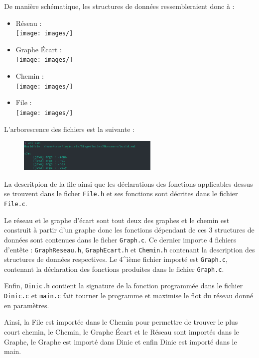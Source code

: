 \documentclass[11pt, a4paper]{report}
\begin{document}
	De manière schématique, les structures de données ressembleraient donc à :
	\begin{itemize}
        \item Réseau :\\
		\texttt{[image: images/]}\\
        \item Graphe Écart :\\
		\texttt{[image: images/]}\\
        \item Chemin :\\
		\texttt{[image: images/]}\\
        \item File :\\
		\texttt{[image: images/]}\\
	\end{itemize}
	
	L'arborescence des fichiers est la suivante :
	
	\begin{figure}[H]
		\captionsetup{justification=centering}
		\centering
		\includegraphics[width=0.6\textwidth]{images/ants2m.png}
	\end{figure}
	
	La descritpion de la file ainsi que les déclarations des fonctions applicables dessus se trouvent dans le ficher \verb|File.h| et ses fonctions sont décrites dans le fichier \verb|File.c|.
	
	Le réseau et le graphe d'écart sont tout deux des graphes et le chemin est construit à partir d'un graphe donc les fonctions dépendant de ces 3 structures de données sont contenues dans le ficher \verb|Graph.c|. Ce dernier importe 4 fichiers d'entête : \verb|GraphReseau.h|, \verb|GraphEcart.h| et \verb|Chemin.h| contenant la description des structures de données respectives. Le 4^{ième} fichier importé est \verb|Graph.c|, contenant la déclaration des fonctions produites dans le fichier \verb|Graph.c|.
	
	Enfin, \verb|Dinic.h| contient la signature de la fonction programmée dans le fichier \verb|Dinic.c| et \verb|main.c| fait tourner le programme et maximise le flot du réseau donné en paramètres.
	
	Ainsi, la File est importée dans le Chemin pour permettre de trouver le plus court chemin, le Chemin, le Graphe Écart et le Réseau sont importés dans le Graphe, le Graphe est importé dans Dinic et enfin Dinic est importé dans le main.
	
\end{document}
